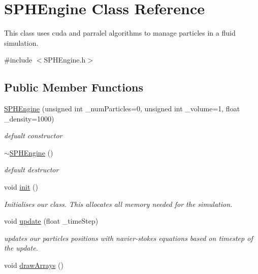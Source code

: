 \hypertarget{class_s_p_h_engine}{\section{S\-P\-H\-Engine Class Reference}
\label{class_s_p_h_engine}
}


This class uses cuda and parralel algorithms to manage particles in a fluid simulation.  




{\ttfamily \#include $<$S\-P\-H\-Engine.\-h$>$}

\subsection*{Public Member Functions}
\begin{DoxyCompactItemize}
\item 
\hyperlink{class_s_p_h_engine_a7ac2d6cd3692ce0c0521435384ad3869}{S\-P\-H\-Engine} (unsigned int \-\_\-num\-Particles=0, unsigned int \-\_\-volume=1, float \-\_\-density=1000)
\begin{DoxyCompactList}\small\item\em defualt constructor \end{DoxyCompactList}\item 
\hypertarget{class_s_p_h_engine_a0969407c141667c1147d409a0397257d}{\hyperlink{class_s_p_h_engine_a0969407c141667c1147d409a0397257d}{$\sim$\-S\-P\-H\-Engine} ()}\label{class_s_p_h_engine_a0969407c141667c1147d409a0397257d}

\begin{DoxyCompactList}\small\item\em default destructor \end{DoxyCompactList}\item 
\hypertarget{class_s_p_h_engine_a0df6d1b33d50afb152e2992de5af5700}{void \hyperlink{class_s_p_h_engine_a0df6d1b33d50afb152e2992de5af5700}{init} ()}\label{class_s_p_h_engine_a0df6d1b33d50afb152e2992de5af5700}

\begin{DoxyCompactList}\small\item\em Initialises our class. This allocates all memory needed for the simulation. \end{DoxyCompactList}\item 
void \hyperlink{class_s_p_h_engine_a1a17b5c04756850b68cf95b917019241}{update} (float \-\_\-time\-Step)
\begin{DoxyCompactList}\small\item\em updates our particles positions with navier-\/stokes equations based on timestep of the update. \end{DoxyCompactList}\item 
\hypertarget{class_s_p_h_engine_a91f224d67175615716059dba23c38a98}{void \hyperlink{class_s_p_h_engine_a91f224d67175615716059dba23c38a98}{draw\-Arrays} ()}\label{class_s_p_h_engine_a91f224d67175615716059dba23c38a98}


\end{DoxyCompactItemize}
